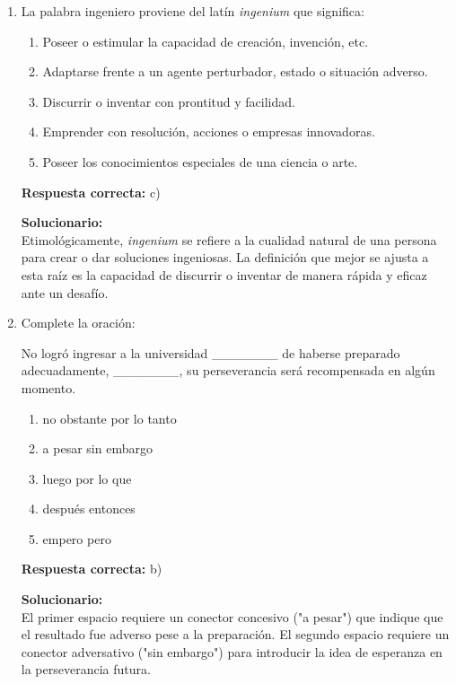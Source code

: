 \begin{enumerate}
	
	\item La palabra ingeniero proviene del latín \textit{ingenium} que significa:
	
	\begin{enumerate}[label=\alph*)]
		\item Poseer o estimular la capacidad de creación, invención, etc.
		\item Adaptarse frente a un agente perturbador, estado o situación adverso.
		\item Discurrir o inventar con prontitud y facilidad.
		\item Emprender con resolución, acciones o empresas innovadoras.
		\item Poseer los conocimientos especiales de una ciencia o arte.
	\end{enumerate}
	
	\textbf{Respuesta correcta:} c)
	
	\vspace{2mm}
	\textbf{Solucionario:}\\
	Etimológicamente, \textit{ingenium} se refiere a la cualidad natural de una persona para crear o dar soluciones ingeniosas. La definición que mejor se ajusta a esta raíz es la capacidad de discurrir o inventar de manera rápida y eficaz ante un desafío.
	
	\vspace{6mm}
	
	\item Complete la oración:
	
	No logró ingresar a la universidad \_\_\_\_\_\_\_ de haberse preparado adecuadamente, \_\_\_\_\_\_\_, su perseverancia será recompensada en algún momento.
	
	\begin{enumerate}[label=\alph*)]
		\item no obstante \textemdash por lo tanto
		\item a pesar \textemdash sin embargo
		\item luego \textemdash por lo que
		\item después \textemdash entonces
		\item empero \textemdash pero
	\end{enumerate}
	
	\textbf{Respuesta correcta:} b)
	
	\vspace{2mm}
	\textbf{Solucionario:}\\
	El primer espacio requiere un conector concesivo ("a pesar") que indique que el resultado fue adverso pese a la preparación. El segundo espacio requiere un conector adversativo ("sin embargo") para introducir la idea de esperanza en la perseverancia futura.
	

\end{enumerate}
